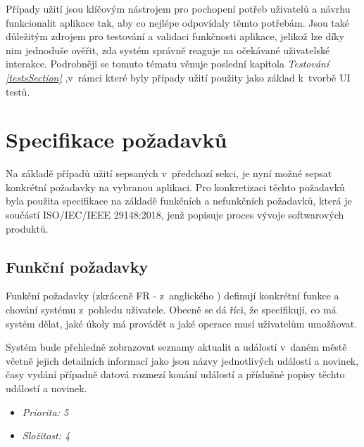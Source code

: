 \bigskip

Případy užití jsou klíčovým nástrojem pro pochopení potřeb uživatelů a návrhu funkcionalit aplikace tak, aby co nejlépe odpovídaly těmto potřebám. 
Jsou také důležitým zdrojem pro testování a validaci funkčnosti aplikace, jelikož lze díky nim jednoduše ověřit, zda systém správně reaguje na očekávané 
uživatelské interakce. Podrobněji se tomuto tématu věnuje poslední kapitola \textit{Testování \ref{testsSection}} ,v~rámci které byly případy užití
použity jako základ k~tvorbě UI testů.



\section{Specifikace požadavků}
Na základě případů užití sepsaných v~předchozí sekci, je nyní možné sepsat konkrétní požadavky na vybranou aplikaci.
Pro konkretizaci těchto požadavků byla použita specifikace na základě funkčních a nefunkčních požadavků, která je součástí ISO/IEC/IEEE 29148:2018,
jenž popisuje proces vývoje softwarových produktů.

\subsection{Funkční požadavky}
Funkční požadavky (zkráceně FR - z~anglického ) definují konkrétní funkce a chování systému z~pohledu uživatele. Obecně se dá říci, že specifikují,
co má systém dělat, jaké úkoly má provádět a jaké operace musí uživatelům umožňovat. 


Systém bude přehledně zobrazovat seznamy aktualit a událostí v~daném městě včetně jejich detailních informací jako jsou názvy jednotlivých
událostí a novinek, časy vydání případně datová rozmezí konání událostí a příslušné popisy těchto událostí a novinek.

\begin{itemize}
  \item \textit{Priorita: 5}
  \item \textit{Složitost: 4}
\end{itemize}


